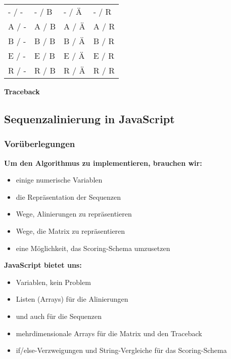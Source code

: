 \begin{longtable}[c]{@{}llll@{}}
\toprule
- / - & - / B & - / Ä & - / R\tabularnewline
A / - & A / B & A / Ä & A / R\tabularnewline
B / - & B / B & B / Ä & B / R\tabularnewline
E / - & E / B & E / Ä & E / R\tabularnewline
R / - & R / B & R / Ä & R / R\tabularnewline
\bottomrule
\end{longtable}





\vspace{0.5cm}\par\noindent\textbf{Traceback}\vspace{0.5cm}






\subsection{\texorpdfstring{{Sequenzalinierung in
JavaScript}}{Sequenzalinierung in JavaScript}}

\subsubsection{\texorpdfstring{{Vorüberlegungen}}{Vorüberlegungen}}

\vspace{0.5cm}\par\noindent\textbf{Um den Algorithmus zu implementieren, brauchen wir:}\vspace{0.5cm}

\begin{itemize}
\itemsep1pt\parskip0pt
\item
  einige numerische Variablen
\item
  die Repräsentation der Sequenzen
\item
  Wege, Alinierungen zu repräsentieren
\item
  Wege, die Matrix zu repräsentieren
\item
  eine Möglichkeit, das Scoring-Schema umzusetzen
\end{itemize}



\vspace{0.5cm}\par\noindent\textbf{JavaScript bietet uns:}\vspace{0.5cm}

\begin{itemize}
\itemsep1pt\parskip0pt
\item
  Variablen, kein Problem
\item
  Listen (Arrays) für die Alinierungen
\item
  und auch für die Sequenzen
\item
  mehrdimensionale Arrays für die Matrix und den Traceback
\item
  if/else-Verzweigungen und String-Vergleiche für das Scoring-Schema
\end{itemize}


